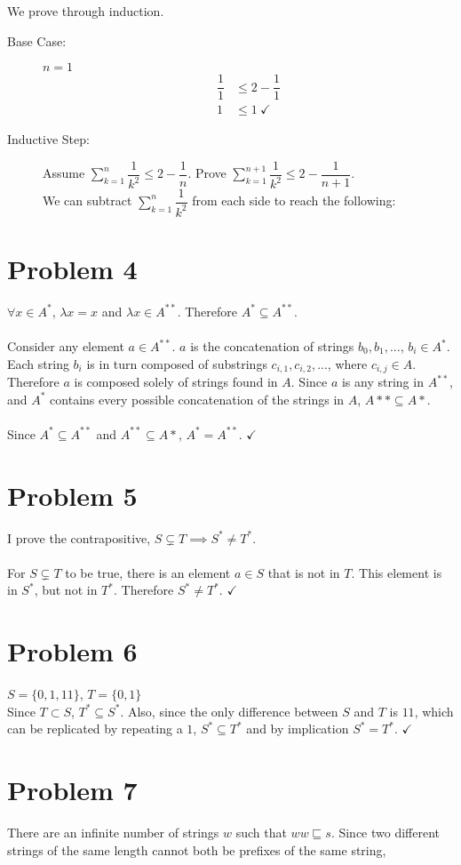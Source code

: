 \documentclass[11pt]{article}
\begin{document}
We prove through induction.
\begin{description}
	\item[Base Case:] $n= 1$
		\begin{align*}
				\dfrac{1}{1} &\leq 2 - \dfrac{1}{1}\\
				1 &\leq 1\ \checkmark
		\end{align*}
		
	\item[Inductive Step:] Assume $\sum\limits_{k=1}^n \dfrac{1}{k^2} \leq 2 - \dfrac{1}{n}$. Prove $\sum\limits_{k=1}^{n+1} \dfrac{1}{k^2} \leq 2 - \dfrac{1}{n+1}$. \\
	We can subtract $\sum\limits_{k=1}^{n} \dfrac{1}{k^2}$ from each side to reach the following:


\end{description}

\section*{Problem 4}

$\forall x \in A^*$, $\lambda x = x$ and $ \lambda x \in A^{**}$. Therefore $A^* \subseteq A^{**}$.\\\\
Consider any element $a \in A^{**}$. $a$ is the concatenation of strings $b_0, b_1,...$, $b_i \in A^*$. Each string $b_i$ is in turn composed of substrings $c_{i,1}, c_{i,2}, ...$, where $c_{i,j} \in A$. Therefore $a$ is composed solely of strings found in $A$. Since $a$ is any string in $A^{**}$, and $A^*$ contains every possible concatenation of the strings in $A$, $A** \subseteq A*$.\\\\
Since $A^* \subseteq A^{**}$ and $A^{**} \subseteq A*$, $A^* = A^{**}$. $\checkmark$

\section*{Problem 5}

I prove the contrapositive, $ S \subsetneq T \implies S^* \neq T^*$.\\\\
For $S \subsetneq T$ to be true, there is an element $a \in S$ that is not in $T$. This element is in $S^*$, but not in $T^*$. Therefore $S^* \neq T^*$. $\checkmark$


\section*{Problem 6}
$ S = \{0, 1, 11\}$, $T = \{0, 1\}$\\
Since $T \subset S$, $T^* \subseteq S^*$. Also, since the only difference between $S$ and $T$ is $11$, which can be replicated by repeating a $1$, $S^* \subseteq T^*$ and by implication $S^* = T^*$. $\checkmark$


\section*{Problem 7}
There are an infinite number of strings $w$ such that $ww \sqsubseteq s$. Since two different strings of the same length cannot both be prefixes of the same string, 
\end{document}
